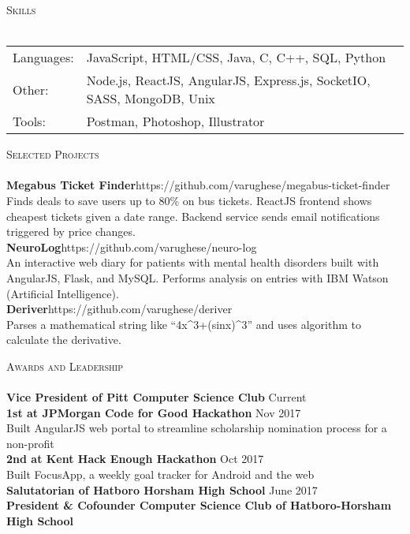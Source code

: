 \documentclass[a4paper]{article}
\newcommand{\lineunder} {
    \vspace*{-8pt} \\
    \hspace*{-18pt} \hrulefill \\
}
\newcommand{\header} [1] {
    {\hspace*{-18pt}\vspace*{6pt} \textsc{#1}}
    \vspace*{-6pt} \lineunder
}
\begin{document}
\header{Skills}
\begin{tabular}{ l l }
	Languages: & JavaScript, HTML/CSS, Java, C, C++, SQL, Python                        \\
	Other:     & Node.js, ReactJS, AngularJS, Express.js, SocketIO, SASS, MongoDB, Unix \\
	Tools:     & Postman, Photoshop, Illustrator                                        \\
\end{tabular}
\vspace{2mm}

\header{Selected Projects}
{\textbf{Megabus Ticket Finder}}\hfill https://github.com/varughese/megabus-ticket-finder\\
Finds deals to save users up to 80\% on bus tickets. ReactJS frontend shows cheapest tickets given a date range. Backend service sends email notifications triggered by price changes.\\
\vspace*{2mm}
{\textbf{NeuroLog}}\hfill https://github.com/varughese/neuro-log\\
An interactive web diary for patients with mental health disorders built with AngularJS, Flask, and MySQL. Performs analysis on entries with IBM Watson (Artificial Intelligence).\\
\vspace*{2mm}
{\textbf{Deriver}}\hfill https://github.com/varughese/deriver\\
Parses a mathematical string like “4x\textasciicircum{}3+(sinx)\textasciicircum{}3” and uses algorithm to calculate the derivative.\\
\vspace*{2mm}

\header{Awards and Leadership}
\textbf{Vice President of Pitt Computer Science Club} \hfill Current\\

\vspace*{2mm}
\textbf{1st at JPMorgan Code for Good Hackathon} \hfill Nov 2017 \\
Built AngularJS web portal to streamline scholarship nomination process for a non-profit \\
\vspace*{2mm}
\textbf{2nd at Kent Hack Enough Hackathon}  \hfill Oct 2017 \\
Built FocusApp, a weekly goal tracker for Android and the web \\
\vspace*{2mm}
\textbf{Salutatorian of Hatboro Horsham High School} \hfill June 2017 \\
\vspace*{2mm}
\textbf{President \& Cofounder Computer Science Club of Hatboro-Horsham High School}\\

\vspace*{2mm}

\ 
\end{document}
